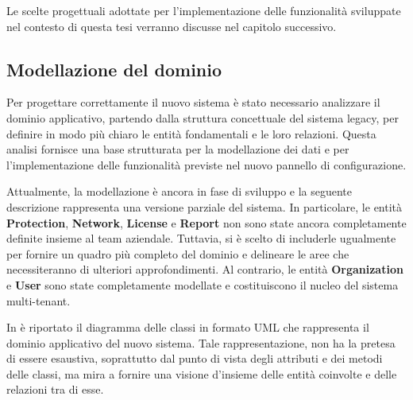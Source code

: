 Le scelte progettuali adottate per l'implementazione delle funzionalità sviluppate nel contesto di questa tesi verranno discusse nel capitolo successivo.

\subsection{Modellazione del dominio}\label{sec:domain-analysis}
Per progettare correttamente il nuovo sistema è stato necessario analizzare il dominio applicativo, partendo dalla struttura concettuale del sistema legacy, per definire in modo più chiaro le entità fondamentali e le loro relazioni. Questa analisi fornisce una base strutturata per la modellazione dei dati e per l'implementazione delle funzionalità previste nel nuovo pannello di configurazione.

Attualmente, la modellazione è ancora in fase di sviluppo e la seguente descrizione rappresenta una versione parziale del sistema. In particolare, le entità \textbf{Protection}, \textbf{Network}, \textbf{License} e \textbf{Report} non sono state ancora completamente definite insieme al team aziendale. Tuttavia, si è scelto di includerle ugualmente per fornire un quadro più completo del dominio e delineare le aree che necessiteranno di ulteriori approfondimenti.
%
Al contrario, le entità \textbf{Organization} e \textbf{User} sono state completamente modellate e costituiscono il nucleo del sistema multi-tenant.

In  è riportato il diagramma delle classi in formato UML che rappresenta il dominio applicativo del nuovo sistema. Tale rappresentazione, non ha la pretesa di essere esaustiva, soprattutto dal punto di vista degli attributi e dei metodi delle classi, ma mira a fornire una visione d'insieme delle entità coinvolte e delle relazioni tra di esse.

